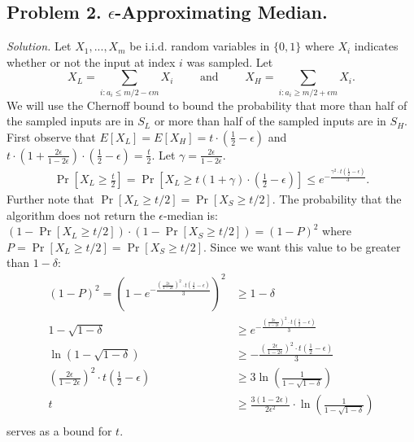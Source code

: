 \documentclass[11pt]{article}
\begin{document}
\subsection*{Problem 2. $\epsilon$-Approximating Median.}
\emph{Solution.} Let $X_1, ..., X_m$ be i.i.d. random variables in $\{0,1\}$ where $X_i$ indicates whether or not the input at index $i$ was sampled. Let 
\[X_{L} = \sum_{i:a_i \leq m/2-\epsilon m} X_i \qquad\mbox{ and }\qquad X_{H} = \sum_{i:a_i \geq m/2+\epsilon m} X_i.\]
We will use the Chernoff bound to bound the probability that more than half of the sampled inputs are in $S_L$ or more than half of the sampled inputs are in $S_H$. First observe that $E[X_L] = E[X_H] = t\cdot \left(\frac{1}{2} - \epsilon \right)$ and $t\cdot\left(1 + \frac{2\epsilon}{1-2\epsilon}\right)\cdot\left(\frac{1}{2} - \epsilon \right) = \frac{t}{2}$. Let $\gamma = \frac{2\epsilon}{1-2\epsilon}$.
\begin{align*}
\Pr\left[X_{L} \geq \frac{t}{2}\right] = \Pr\left[X_{L} \geq t\left(1 + \gamma\right)\cdot\left(\frac{1}{2} - \epsilon \right)\right] \leq e^{-\frac{\gamma^2\cdot t\left(\frac{1}{2} - \epsilon \right)}{3}}. 
\end{align*}
Further note that $\Pr[X_L \geq t/2] = \Pr[X_S \geq t/2]$. The probability that the algorithm does not return the $\epsilon$-median is: $\left(1-\Pr[X_L \geq t/2]\right)\cdot \left(1-\Pr[X_S \geq t/2]\right) = (1-P)^2$ where $P = \Pr[X_L \geq t/2] = \Pr[X_S \geq t/2]$. Since we want this value to be greater than $1-\delta$: 
\begin{align*}
(1-P)^2 = \left(1-e^{-\frac{\left(\frac{2\epsilon}{1-2\epsilon}\right)^2\cdot t\left(\frac{1}{2} - \epsilon \right)}{3}}\right)^2 &\geq 1-\delta\\
1-\sqrt{1-\delta} & \geq e^{-\frac{\left(\frac{2\epsilon}{1-2\epsilon}\right)^2\cdot t\left(\frac{1}{2} - \epsilon \right)}{3}}\\
\ln\left(1-\sqrt{1-\delta}\right) & \geq -\frac{\left(\frac{2\epsilon}{1-2\epsilon}\right)^2\cdot t\left(\frac{1}{2} - \epsilon \right)}{3}\\
\left(\frac{2\epsilon}{1-2\epsilon}\right)^2\cdot t\left(\frac{1}{2} - \epsilon \right) &\geq 3\ln\left(\frac{1}{1-\sqrt{1-\delta}}\right)\\
t &\geq \frac{3(1-2\epsilon)}{2\epsilon^2}\cdot\ln\left(\frac{1}{1-\sqrt{1-\delta}}\right)\\
\end{align*}
serves as a bound for $t$.
\end{document}
